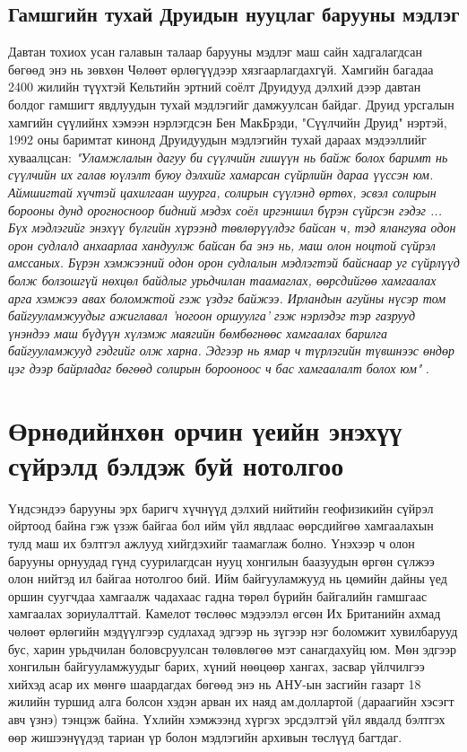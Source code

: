 \documentclass[10pt,twocolumn,letterpaper]{article}
\begin{document}
\subsection{Гамшгийн тухай Друидын нууцлаг барууны мэдлэг}

Давтан тохиох усан галавын талаар барууны мэдлэг маш сайн хадгалагдсан бөгөөд энэ нь зөвхөн Чөлөөт өрлөгүүдээр хязгаарлагдахгүй. Хамгийн багадаа 2400 жилийн түүхтэй Кельтийн эртний соёлт Друидууд \cite{7} дэлхий дээр давтан болдог гамшигт явдлуудын тухай мэдлэгийг дамжуулсан байдаг. Друид урсгалын хамгийн сүүлийнх хэмээн нэрлэгдсэн Бен МакБрэди, "Сүүлчийн Друид" нэртэй, 1992 оны баримтат кинонд Друидуудын мэдлэгийн тухай дараах мэдээллийг хуваалцсан: \textit{"Уламжлалын дагуу би сүүлчийн гишүүн нь байж болох баримт нь сүүлчийн их галав юүлэлт буюу дэлхийг хамарсан сүйрлийн дараа үүссэн юм. Аймшигтай хүчтэй цахилгаан шуурга, солирын сүүлэнд өртөх, эсвэл солирын борооны дунд орогносноор бидний мэдэх соёл иргэншил бүрэн сүйрсэн гэдэг ... Бүх мэдлэгийг энэхүү бүлгийн хүрээнд төвлөрүүлдэг байсан ч, тэд ялангуяа одон орон судлалд анхаарлаа хандуулж байсан ба энэ нь, маш олон ноцтой сүйрэл амссаных. Бүрэн хэмжээний одон орон судлалын мэдлэгтэй байснаар уг сүйрлүүд болж болзошгүй нөхцөл байдлыг урьдчилан таамаглах, өөрсдийгөө хамгаалах арга хэмжээ авах боломжтой гэж үздэг байжээ. Ирландын агуйны нүсэр том байгууламжуудыг ажиглавал 'ногоон оршуулга' гэж нэрлэдэг тэр газрууд үнэндээ маш бүдүүн хүлэмж маягийн бөмбөгнөөс хамгаалах барилга байгууламжууд гэдгийг олж харна. Эдгээр нь ямар ч түрлэгийн түвшнээс өндөр цэг дээр байрладаг бөгөөд солирын борооноос ч бас хамгаалалт болох юм"} \cite{8,9}.

\section{Өрнөдийнхөн орчин үеийн энэхүү сүйрэлд бэлдэж буй нотолгоо}

Үндсэндээ барууны эрх баригч хүчнүүд дэлхий нийтийн геофизикийн сүйрэл ойртоод байна гэж үзэж байгаа бол ийм үйл явдлаас өөрсдийгөө хамгаалахын тулд маш их бэлтгэл ажлууд хийгдэхийг таамаглаж болно. Үнэхээр ч олон барууны орнуудад гүнд суурилагдсан нууц хонгилын баазуудын өргөн сүлжээ олон нийтэд ил байгаа нотолгоо бий. Ийм байгууламжууд нь цөмийн дайны үед оршин суугчдаа хамгаалж чадахаас гадна төрөл бүрийн байгалийн гамшгаас хамгаалах зориулалттай. Камелот төслөөс \cite{4,6} мэдээлэл өгсөн Их Британийн ахмад чөлөөт өрлөгийн мэдүүлгээр судлахад эдгээр нь зүгээр нэг боломжит хувилбарууд бус, харин урьдчилан боловсруулсан төлөвлөгөө мэт санагдахуйц юм. Мөн эдгээр хонгилын байгууламжуудыг барих, хүний нөөцөөр хангах, засвар үйлчилгээ хийхэд асар их мөнгө шаардагдах бөгөөд энэ нь АНУ-ын засгийн газарт 18 жилийн туршид алга болсон хэдэн арван их наяд ам.доллартой (дараагийн хэсэгт авч үзнэ) \cite{11,12,13} тэнцэж байна. Үхлийн хэмжээнд хүргэх эрсдэлтэй үйл явдалд бэлтгэх өөр жишээнүүдэд тариан үр болон мэдлэгийн архивын төслүүд багтдаг.
\end{document}
